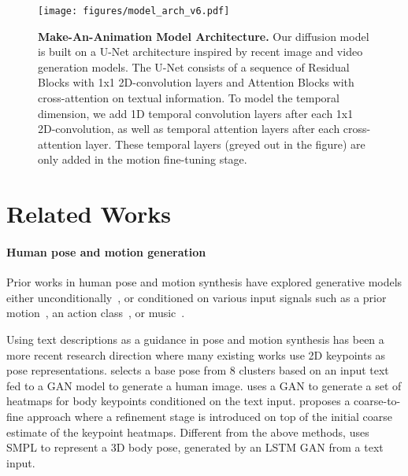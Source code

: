 \documentclass[10pt,twocolumn,letterpaper]{article}
\begin{document}
\begin{figure*}
  \centering \texttt{[image: figures/model\_arch\_v6.pdf]}
  \caption{\textbf{Make-An-Animation Model Architecture.} Our diffusion model is built on a U-Net architecture inspired by recent image and video generation models. The U-Net consists of a sequence of Residual Blocks with 1x1 2D-convolution layers and Attention Blocks with cross-attention on textual information. To model the temporal dimension, we add 1D temporal convolution layers after each 1x1 2D-convolution, as well as temporal attention layers after each cross-attention layer. These temporal layers (greyed out in the figure) are only added in the motion fine-tuning stage.}
  \label{fig:model_arch}
\end{figure*}


\section{Related Works}

 \paragraph{Human pose and motion generation}
 
Prior works in human pose and motion synthesis have explored generative models either unconditionally~\cite{yan2019, zhao2020, modi2022}, or conditioned on various input signals such as a prior motion~\cite{julieta2017, ruiz2019}, an action class~\cite{guo2020a2m, petrovich2021actor, cervantes2022}, or music~\cite{lee2019, li2021}. 

Using text descriptions as a guidance in pose and motion synthesis has been a more recent research direction where many existing works use 2D keypoints as pose representations. \cite{zhou2019pose} selects a base pose from 8 clusters based on an input text fed to a GAN model to generate a human image. \cite{zhang2021} uses a GAN to generate a set of heatmaps for body keypoints conditioned on the text input. \cite{roy2022} proposes a coarse-to-fine approach where a refinement stage is introduced on top of the initial coarse estimate of the keypoint heatmaps. Different from the above methods, \cite{briq2021} uses SMPL to represent a 3D body pose, generated by an LSTM GAN from a text input.
\end{document}
